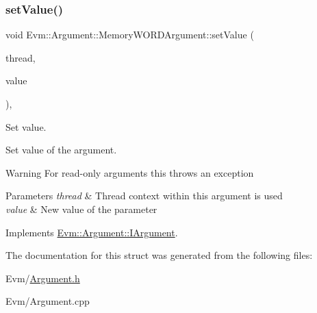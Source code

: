 \subsubsection{\texorpdfstring{set\+Value()}{setValue()}}
{\footnotesize\ttfamily void Evm\+::\+Argument\+::\+Memory\+W\+O\+R\+D\+Argument\+::set\+Value (\begin{DoxyParamCaption}\item[{\mbox{\hyperlink{struct_evm_1_1_thread_context}{Thread\+Context}} \&}]{thread,  }\item[{uint64\+\_\+t}]{value }\end{DoxyParamCaption})\hspace{0.3cm}{\ttfamily [override]}, {\ttfamily [virtual]}}



Set value. 

Set value of the argument. \begin{DoxyWarning}{Warning}
For read-\/only arguments this throws an exception 
\end{DoxyWarning}

\begin{DoxyParams}{Parameters}
{\em thread} & Thread context within this argument is used \\
\hline
{\em value} & New value of the parameter \\
\hline
\end{DoxyParams}


Implements \mbox{\hyperlink{struct_evm_1_1_argument_1_1_i_argument_a24e4c76f2750e664e3895d2ff4b9146d}{Evm\+::\+Argument\+::\+I\+Argument}}.



The documentation for this struct was generated from the following files\+:\begin{DoxyCompactItemize}
\item 
Evm/\mbox{\hyperlink{_argument_8h}{Argument.\+h}}\item 
Evm/Argument.\+cpp\end{DoxyCompactItemize}
